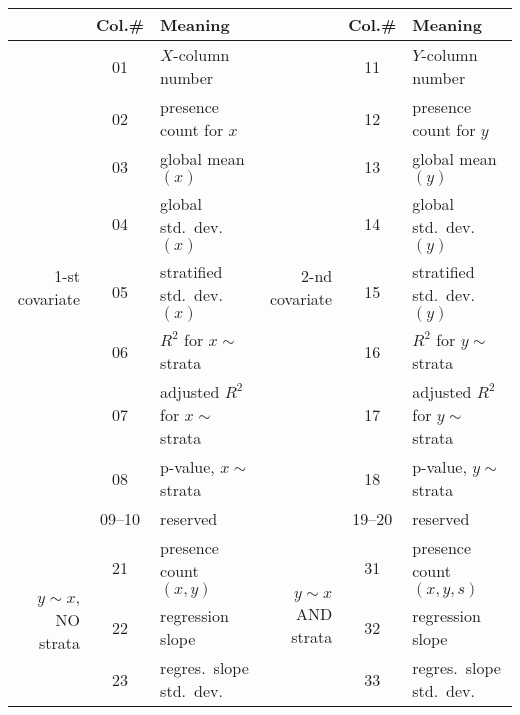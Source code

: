 \begin{table}[t]\small\hfil
\begin{tabular}{|rcl|rcl|}
\hline
& Col.\# & Meaning & & Col.\# & Meaning \\
\hline
\multirow{9}{*}{\begin{sideways}1-st covariate\end{sideways}}\hspace{-1em}
& 01     & $X$-column number                & 
\multirow{9}{*}{\begin{sideways}2-nd covariate\end{sideways}}\hspace{-1em}
& 11     & $Y$-column number                \\
& 02     & presence count for $x$           & 
& 12     & presence count for $y$           \\
& 03     & global mean $(x)$                & 
& 13     & global mean $(y)$                \\
& 04     & global std.\ dev. $(x)$          & 
& 14     & global std.\ dev. $(y)$          \\
& 05     & stratified std.\ dev. $(x)$      & 
& 15     & stratified std.\ dev. $(y)$      \\
& 06     & $R^2$ for $x \sim {}$strata      & 
& 16     & $R^2$ for $y \sim {}$strata      \\
& 07     & adjusted $R^2$ for $x \sim {}$strata      & 
& 17     & adjusted $R^2$ for $y \sim {}$strata      \\
& 08     & p-value, $x \sim {}$strata       & 
& 18     & p-value, $y \sim {}$strata       \\
& 09--10 & reserved                         & 
& 19--20 & reserved                         \\
\hline
\multirow{9}{*}{\begin{sideways}$y\sim x$, NO strata\end{sideways}}\hspace{-1.15em}
& 21     & presence count $(x, y)$          &
\multirow{10}{*}{\begin{sideways}$y\sim x$ AND strata$\!\!\!\!$\end{sideways}}\hspace{-1.15em}
& 31     & presence count $(x, y, s)$       \\
& 22     & regression slope                 &
& 32     & regression slope                 \\
& 23     & regres.\ slope std.\ dev.        &
& 33     & regres.\ slope std.\ dev.        \\

\end{tabular}
\end{table}
